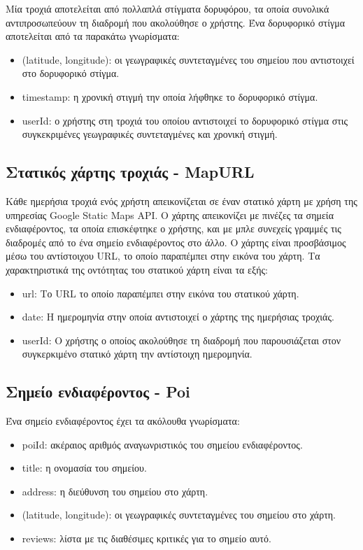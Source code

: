 Μία τροχιά αποτελείται από πολλαπλά στίγματα δορυφόρου, τα οποία συνολικά αντιπροσωπεύουν τη διαδρομή που ακολούθησε ο χρήστης. Ένα δορυφορικό στίγμα αποτελείται 
από τα παρακάτω γνωρίσματα:

\begin{itemize}
 \item (latitude, longitude): οι γεωγραφικές συντεταγμένες του σημείου που αντιστοιχεί στο δορυφορικό στίγμα.
 \item timestamp: η χρονική στιγμή την οποία λήφθηκε το δορυφορικό στίγμα.
 \item userId: ο χρήστης στη τροχιά του οποίου αντιστοιχεί το δορυφορικό στίγμα στις συγκεκριμένες γεωγραφικές συντεταγμένες και χρονική στιγμή.
\end{itemize}

\subsection{Στατικός χάρτης τροχιάς - MapURL}

Κάθε ημερήσια τροχιά ενός χρήστη απεικονίζεται σε έναν στατικό χάρτη με χρήση της υπηρεσίας Google Static Maps API. Ο χάρτης απεικονίζει 
με πινέζες τα σημεία ενδιαφέροντος, τα οποία επισκέφτηκε ο χρήστης, και με μπλε συνεχείς γραμμές τις διαδρομές από το ένα σημείο ενδιαφέροντος στο άλλο.
Ο χάρτης είναι προσβάσιμος μέσω του αντίστοιχου URL, το οποίο παραπέμπει στην εικόνα του χάρτη. Τα χαρακτηριστικά της οντότητας του στατικού χάρτη είναι τα εξής:

\begin{itemize}
 \item url: Το URL το οποίο παραπέμπει στην εικόνα του στατικού χάρτη.
 \item date: Η ημερομηνία στην οποία αντιστοιχεί ο χάρτης της ημερήσιας τροχιάς.
 \item userId: Ο χρήστης ο οποίος ακολούθησε τη διαδρομή που παρουσιάζεται στον συγκερκιμένο στατικό χάρτη την αντίστοιχη ημερομηνία.
\end{itemize}

\subsection{Σημείο ενδιαφέροντος - Poi}

Ένα σημείο ενδιαφέροντος έχει τα ακόλουθα γνωρίσματα:

\begin{itemize}
 \item poiId: ακέραιος αριθμός αναγωνριστικός του σημείου ενδιαφέροντος.
 \item title: η ονομασία του σημείου.
 \item address: η διεύθυνση του σημείου στο χάρτη.
 \item (latitude, longitude): οι γεωγραφικές συντεταγμένες του σημείου στο χάρτη.
 \item reviews: λίστα με τις διαθέσιμες κριτικές για το σημείο αυτό.
\end{itemize}

